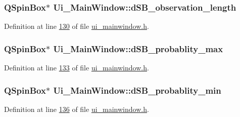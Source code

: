 \hypertarget{a00027_a1fe1bf902f2a365c4c94612d2a2ffbcc}{
\subsubsection[{d\+S\+B\+\_\+observation\+\_\+length}]{\setlength{\rightskip}{0pt plus 5cm}Q\+Spin\+Box$\ast$ Ui\+\_\+\+Main\+Window\+::d\+S\+B\+\_\+observation\+\_\+length}}\label{a00027_a1fe1bf902f2a365c4c94612d2a2ffbcc}


Definition at line \hyperlink{a00052_source_l00130}{130} of file \hyperlink{a00052_source}{ui\+\_\+mainwindow.\+h}.

\hypertarget{a00027_a137b79e810736643ac4b15e221909871}{
\subsubsection[{d\+S\+B\+\_\+probablity\+\_\+max}]{\setlength{\rightskip}{0pt plus 5cm}Q\+Spin\+Box$\ast$ Ui\+\_\+\+Main\+Window\+::d\+S\+B\+\_\+probablity\+\_\+max}}\label{a00027_a137b79e810736643ac4b15e221909871}


Definition at line \hyperlink{a00052_source_l00133}{133} of file \hyperlink{a00052_source}{ui\+\_\+mainwindow.\+h}.

\hypertarget{a00027_adfd6cf470c736f358c6982f9a635f04f}{
\subsubsection[{d\+S\+B\+\_\+probablity\+\_\+min}]{\setlength{\rightskip}{0pt plus 5cm}Q\+Spin\+Box$\ast$ Ui\+\_\+\+Main\+Window\+::d\+S\+B\+\_\+probablity\+\_\+min}}\label{a00027_adfd6cf470c736f358c6982f9a635f04f}


Definition at line \hyperlink{a00052_source_l00136}{136} of file \hyperlink{a00052_source}{ui\+\_\+mainwindow.\+h}.

